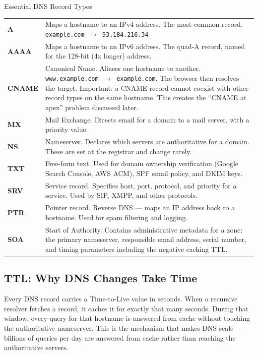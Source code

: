 \documentclass[11pt,a4paper]{article}
\begin{document}
\begin{termbox}{Essential DNS Record Types}
\begin{tabular}{@{}p{2cm}p{11.5cm}@{}}
\textbf{A} & Maps a hostname to an IPv4 address. The most common record. \texttt{example.com $\to$ 93.184.216.34} \\[4pt]
\textbf{AAAA} & Maps a hostname to an IPv6 address. The quad-A record, named for the 128-bit (4x longer) address. \\[4pt]
\textbf{CNAME} & Canonical Name. Aliases one hostname to another. \texttt{www.example.com $\to$ example.com}. The browser then resolves the target. Important: a CNAME record cannot coexist with other record types on the same hostname. This creates the ``CNAME at apex'' problem discussed later. \\[4pt]
\textbf{MX} & Mail Exchange. Directs email for a domain to a mail server, with a priority value. \\[4pt]
\textbf{NS} & Nameserver. Declares which servers are authoritative for a domain. These are set at the registrar and change rarely. \\[4pt]
\textbf{TXT} & Free-form text. Used for domain ownership verification (Google Search Console, AWS ACM), SPF email policy, and DKIM keys. \\[4pt]
\textbf{SRV} & Service record. Specifies host, port, protocol, and priority for a service. Used by SIP, XMPP, and other protocols. \\[4pt]
\textbf{PTR} & Pointer record. Reverse DNS --- maps an IP address back to a hostname. Used for spam filtering and logging. \\[4pt]
\textbf{SOA} & Start of Authority. Contains administrative metadata for a zone: the primary nameserver, responsible email address, serial number, and timing parameters including the negative caching TTL.
\end{tabular}
\end{termbox}

\subsection{TTL: Why DNS Changes Take Time}

Every DNS record carries a Time-to-Live value in seconds. When a recursive resolver fetches a record, it caches it for exactly that many seconds. During that window, every query for that hostname is answered from cache without touching the authoritative nameserver. This is the mechanism that makes DNS scale --- billions of queries per day are answered from cache rather than reaching the authoritative servers.
\end{document}
